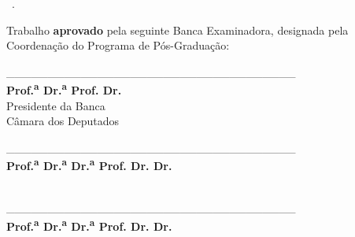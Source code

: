 \documentclass[
	12pt,				%
        openright, %
        twoside,   %
	a4paper,			%
	chapter=TITLE,		%
	english,			%
	french,				%
	spanish,			%
	brazil,				%
    ]{abntex2}
\providecommand{\imprimirlinhadepesquisa}{}
\providecommand{\imprimirmembroA}{}
\providecommand{\imprimirfuncaomembroA}{}
\providecommand{\imprimirfiliacaomembroA}{}
\providecommand{\imprimirmembroB}{}
\providecommand{\imprimirfuncaomembroB}{}
\providecommand{\imprimirfiliacaomembroB}{}
\begin{document}
\begin{folhadeaprovacao}
\begin{minipage}{15.9cm}
{\vspace{-0.5cm}

 \begin{flushright}
      \begin{minipage}{.5\textwidth}
      	 \SingleSpacing
         \imprimirpreambulo\ \textbf{\imprimirlinhadepesquisa}.
         \par\bigskip
      \end{minipage}
      \end{flushright}

\vspace{0.0cm}

Trabalho \textbf{aprovado} pela seguinte Banca Examinadora, designada pela Coordenação do Programa de Pós-Graduação:

\begin{flushleft}
\begin{center}
\vspace{0.9cm}
\_\_\_\_\_\_\_\_\_\_\_\_\_\_\_\_\_\_\_\_\_\_\_\_\_\_\_\_\_\_\_\_\_\_\_\\
{\small \textbf{
{Prof.\textsuperscript{a} Dr.\textsuperscript{a} \imprimirorientador}
{Prof. Dr. \imprimirorientador}}}\\
{\footnotesize Presidente da Banca\\\vspace{-1mm}Câmara dos Deputados}

\vspace{1.4cm}
\_\_\_\_\_\_\_\_\_\_\_\_\_\_\_\_\_\_\_\_\_\_\_\_\_\_\_\_\_\_\_\_\_\_\_\\
{\small \textbf{
        {
        {\textbf{Prof.\textsuperscript{a} Dr.\textsuperscript{a} \imprimirmembroA}}
        {\textbf{Dr.\textsuperscript{a} \imprimirmembroA}}}
            {
            {\textbf{Prof. Dr. \imprimirmembroA}}
            {\textbf{Dr. \imprimirmembroA}}}}}\\
{\footnotesize \imprimirfuncaomembroA\\\vspace{-1mm}\imprimirfiliacaomembroA}

\vspace{1.4cm}
\_\_\_\_\_\_\_\_\_\_\_\_\_\_\_\_\_\_\_\_\_\_\_\_\_\_\_\_\_\_\_\_\_\_\_\\
{\small \textbf{
        {
        {\textbf{Prof.\textsuperscript{a} Dr.\textsuperscript{a} \imprimirmembroB}}
        {\textbf{Dr.\textsuperscript{a} \imprimirmembroB}}}
            {
            {\textbf{Prof. Dr. \imprimirmembroB}}
            {\textbf{Dr. \imprimirmembroB}}}}}\\
{\footnotesize \imprimirfuncaomembroB\\\vspace{-1mm}\imprimirfiliacaomembroB}


\end{center}
\end{flushleft}}
\end{minipage}
\end{folhadeaprovacao}
\end{document}
